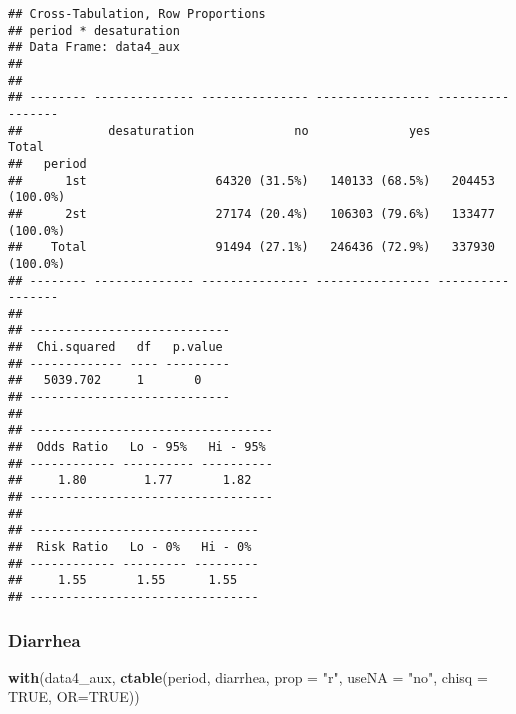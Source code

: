 \documentclass[
]{article}
\newenvironment{Shaded}{\begin{snugshade}}{\end{snugshade}}
\newcommand{\DataTypeTok}[1]{\textcolor[rgb]{0.13,0.29,0.53}{#1}}
\newcommand{\KeywordTok}[1]{\textcolor[rgb]{0.13,0.29,0.53}{\textbf{#1}}}
\newcommand{\NormalTok}[1]{#1}
\newcommand{\OtherTok}[1]{\textcolor[rgb]{0.56,0.35,0.01}{#1}}
\newcommand{\StringTok}[1]{\textcolor[rgb]{0.31,0.60,0.02}{#1}}
\begin{document}
\begin{verbatim}
## Cross-Tabulation, Row Proportions  
## period * desaturation  
## Data Frame: data4_aux  
## 
## 
## -------- -------------- --------------- ---------------- -----------------
##            desaturation              no              yes             Total
##   period                                                                  
##      1st                  64320 (31.5%)   140133 (68.5%)   204453 (100.0%)
##      2st                  27174 (20.4%)   106303 (79.6%)   133477 (100.0%)
##    Total                  91494 (27.1%)   246436 (72.9%)   337930 (100.0%)
## -------- -------------- --------------- ---------------- -----------------
## 
## ----------------------------
##  Chi.squared   df   p.value 
## ------------- ---- ---------
##   5039.702     1       0    
## ----------------------------
## 
## ----------------------------------
##  Odds Ratio   Lo - 95%   Hi - 95% 
## ------------ ---------- ----------
##     1.80        1.77       1.82   
## ----------------------------------
## 
## --------------------------------
##  Risk Ratio   Lo - 0%   Hi - 0% 
## ------------ --------- ---------
##     1.55       1.55      1.55   
## --------------------------------
\end{verbatim}

\hypertarget{diarrhea}{%
\subsubsection{Diarrhea}\label{diarrhea}}

\begin{Shaded}
\begin{Highlighting}[]
\KeywordTok{with}\NormalTok{(data4_aux, }\KeywordTok{ctable}\NormalTok{(period, diarrhea, }\DataTypeTok{prop =} \StringTok{"r"}\NormalTok{, }\DataTypeTok{useNA =} \StringTok{"no"}\NormalTok{, }\DataTypeTok{chisq =} \OtherTok{TRUE}\NormalTok{, }\DataTypeTok{OR=}\OtherTok{TRUE}\NormalTok{))}
\end{Highlighting}
\end{Shaded}
\end{document}
